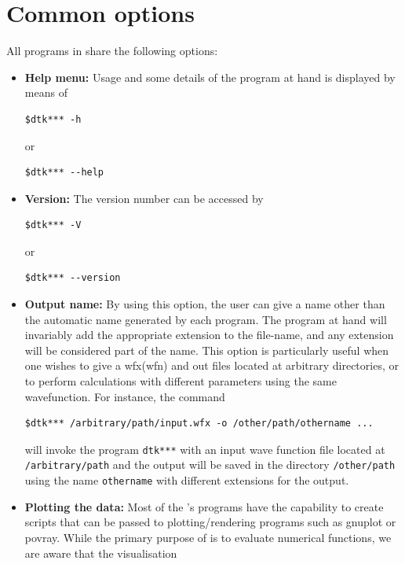 \section{Common options}\label{sec:commonopts}

All programs in \DTK{} share the following options:

\begin{itemize}
   \item \textbf{Help menu:} Usage and some details of the program at hand is displayed by means of
		\begin{lstlisting}
$dtk*** -h
		\end{lstlisting}
	or
		\begin{lstlisting}
$dtk*** --help
		\end{lstlisting}
   \item \textbf{Version:} The version number can be accessed by
   	\begin{lstlisting}
$dtk*** -V
		\end{lstlisting}
	or
		\begin{lstlisting}
$dtk*** --version
		\end{lstlisting}
   \item\textbf{Output name:} By using this option, the user can give a name other
   	than the automatic name generated by each program. The program at hand will invariably add
		the appropriate extension to the file-name, and any extension will be considered part of the name.
	   This option is particularly useful when one wishes to give a wfx(wfn) and out files located at
	   arbitrary directories, or to perform calculations with different parameters using the same wavefunction.
		For instance, the command
		\begin{lstlisting}
$dtk*** /arbitrary/path/input.wfx -o /other/path/othername ...
		\end{lstlisting}
		will invoke the program \texttt{dtk***} with an input wave function file located at
		\texttt{/arbit\-rary\-/path} and the output will be saved in the directory
		\texttt{/other/path} using the name \texttt{othername} with different extensions for the output.
   \item \textbf{Plotting the data:} Most of the \DTK's programs have the capability to create
   	scripts that can be passed to plotting/rendering programs such as gnuplot or povray. While
		the primary purpose of \DTK{} is to evaluate numerical functions, we are aware that the visualisation

\end{itemize}
